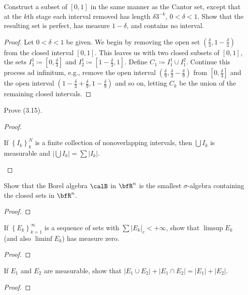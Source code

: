 \begin{problem}
Construct a subset of $[0,1]$ in the same manner as the Cantor set, except
that at the $k$th stage each interval removed has length $\delta 3^{-k}$,
$0<\delta<1$. Show that the resulting set is perfect, has measure
$1-\delta$, and contains no interval.
\end{problem}
\begin{proof}
Let $0<\delta<1$ be given. We begin by removing the open set
$\left(\frac{\delta}{3},1-\frac{\delta}{3}\right)$ from the closed interval
$[0,1]$. This leaves us with two closed subsets of $[0,1]$, the sets
$I_1^1\coloneqq\left[0,\tfrac{\delta}{3}\right]$ and
$I_2^1\coloneqq\left[1-\tfrac{\delta}{3},1\right]$. Define $C_1\coloneqq
I_1^1\cup I_1^2$. Continue this process ad infinitum, e.g., remove the open
interval $\left(\tfrac{\delta}{9},\frac{\delta}{3}-\frac{\delta}{9}\right)$
from $\left[0,\tfrac{\delta}{3}\right]$ and the open interval
$\left(1-\tfrac{\delta}{3}+\tfrac{\delta}{9},1-\tfrac{\delta}{9}\right)$
and so on, letting $C_k$ be the union of the remaining closed intervals.
\end{proof}
\newpage

\begin{problem}
Prove (3.15).
\end{problem}
\begin{proof}
\begin{lemma*}
If $\left\{I_k\right\}_k^N$ is a finite collection of nonoverlapping
intervals, then $\bigcup I_k$ is measurable and $\left|\bigcup
  I_k\right|=\sum\left|I_k\right|$.
\end{lemma*}
\end{proof}
\newpage

\begin{problem}
Show that the Borel algebra $\calB$ in $\bfR^n$ is the smallest
$\sigma$-algebra containing the closed sets in $\bfR^n$.
\end{problem}
\begin{proof}
\end{proof}
\newpage

\begin{problem}
If $\left\{E_k\right\}_{k=1}^\infty$ is a sequence of sets with
$\sum\left|E_k\right|_e<+\infty$, show that $\limsup E_k$ (and
also $\liminf E_k$) has measure zero.
\end{problem}
\begin{proof}
\end{proof}
\newpage

\begin{problem}
If $E_1$ and $E_2$ are measurable, show that
$\left|E_1\cup E_2\right|+\left|E_1\cap
  E_2\right|=\left|E_1\right|+\left|E_2\right|$.
\end{problem}
\begin{proof}
\end{proof}

